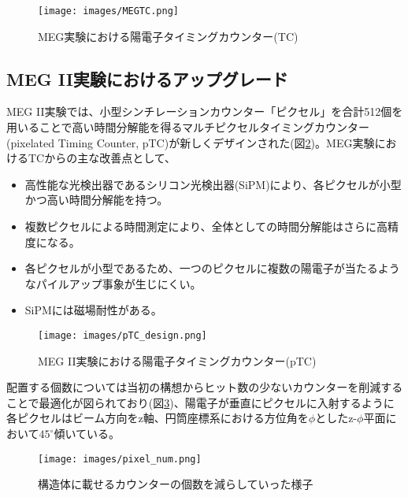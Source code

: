 \documentclass[Yonemoto_master.tex]{subfiles}
\begin{document}
\begin{figure}[h]
\begin{center}
\texttt{[image: images/MEGTC.png]}
\caption{MEG実験における陽電子タイミングカウンター(TC)}
\label{fig: meg_tc}
\end{center}
\end{figure}

\subsection{MEG II実験におけるアップグレード}
MEG II実験では、小型シンチレーションカウンター「ピクセル」を合計512個を用いることで高い時間分解能を得るマルチピクセルタイミングカウンター(pixelated Timing Counter, pTC)が新しくデザインされた(図\ref{fig: megii_ptc_design})。MEG実験におけるTCからの主な改善点として、
\begin{itemize}
\item 高性能な光検出器であるシリコン光検出器(SiPM)により、各ピクセルが小型かつ高い時間分解能を持つ。
\item 複数ピクセルによる時間測定により、全体としての時間分解能はさらに高精度になる。
\item 各ピクセルが小型であるため、一つのピクセルに複数の陽電子が当たるようなパイルアップ事象が生じにくい。
\item SiPMには磁場耐性がある。
\end{itemize}

\begin{figure}[h]
\begin{center}
\texttt{[image: images/pTC\_design.png]}
\caption{MEG II実験における陽電子タイミングカウンター(pTC)}
\label{fig: megii_ptc_design}
\end{center}
\end{figure}

配置する個数については当初の構想からヒット数の少ないカウンターを削減することで最適化が図られており(図\ref{fig: pixel_num})、陽電子が垂直にピクセルに入射するように各ピクセルはビーム方向をz軸、円筒座標系における方位角を$\phi$としたz-$\phi$平面において$45^\circ$傾いている。
\begin{figure}[h]
\begin{center}
\texttt{[image: images/pixel\_num.png]}
\caption{構造体に載せるカウンターの個数を減らしていった様子}
\label{fig: pixel_num}
\end{center}
\end{figure}
\end{document}
